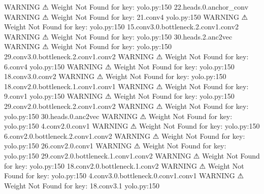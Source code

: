                     WARNING  ⚠ Weight Not Found for key:               yolo.py:150
                             22.heads.0.anchor_conv                               
                    WARNING  ⚠ Weight Not Found for key: 21.conv4      yolo.py:150
                    WARNING  ⚠ Weight Not Found for key:               yolo.py:150
                             15.conv3.0.bottleneck.2.conv1.conv2                  
                    WARNING  ⚠ Weight Not Found for key:               yolo.py:150
                             30.heads.2.anc2vec                                   
                    WARNING  ⚠ Weight Not Found for key:               yolo.py:150
                             29.conv3.0.bottleneck.2.conv1.conv2                  
                    WARNING  ⚠ Weight Not Found for key: 6.conv4       yolo.py:150
                    WARNING  ⚠ Weight Not Found for key:               yolo.py:150
                             18.conv3.0.conv2                                     
                    WARNING  ⚠ Weight Not Found for key:               yolo.py:150
                             18.conv2.0.bottleneck.1.conv1.conv1                  
                    WARNING  ⚠ Weight Not Found for key: 9.conv1       yolo.py:150
                    WARNING  ⚠ Weight Not Found for key:               yolo.py:150
                             29.conv2.0.bottleneck.2.conv1.conv2                  
                    WARNING  ⚠ Weight Not Found for key:               yolo.py:150
                             30.heads.0.anc2vec                                   
                    WARNING  ⚠ Weight Not Found for key:               yolo.py:150
                             4.conv2.0.conv1                                      
                    WARNING  ⚠ Weight Not Found for key:               yolo.py:150
                             6.conv2.0.bottleneck.2.conv1.conv2                   
                    WARNING  ⚠ Weight Not Found for key:               yolo.py:150
                             26.conv2.0.conv1                                     
                    WARNING  ⚠ Weight Not Found for key:               yolo.py:150
                             29.conv2.0.bottleneck.1.conv1.conv2                  
                    WARNING  ⚠ Weight Not Found for key:               yolo.py:150
                             18.conv2.0.bottleneck.1.conv2                        
                    WARNING  ⚠ Weight Not Found for key:               yolo.py:150
                             4.conv3.0.bottleneck.0.conv1.conv1                   
                    WARNING  ⚠ Weight Not Found for key: 18.conv3.1    yolo.py:150
